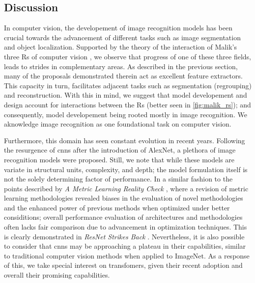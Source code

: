 \subsection{Discussion}
\label{subsec:rel_recon_discussion}
In computer vision, the developement of image recognition models has been crucial 
towards the advancement of different tasks such as image segmentation and object localization. 
Supported by the theory of the interaction of Malik's three Rs of computer vision 
\autocite{malik2016three}, we observe that progress of one of these three fields, leads to strides 
in complementary areas. As described in the previous section, many of the proposals demonstrated 
therein act as excellent feature extractors. This capacity in turn, facilitates adjacent tasks 
such as segmentation (regrouping) and reconstruction. With this in mind, we suggest that model 
developement and design account for interactions between the Rs (better seen in  
\autoref{fig:malik_rs}); and consequently, model developement being rooted mostly in image 
recognition. We aknowledge image recognition as one foundational task on computer vision.



\noindent Furthermore, this domain has seen constant evolution in recent years. Following the 
resurgence of \glspl{cnn} after the introduction of AlexNet, a plethora of image recognition models 
were proposed. Still, we note that while these models are variate in structural units, complexity, 
and depth; the model formulation  itself is not the solely determining factor of performance.  
In a similar fashion to the points described by \emph{A Metric Learning Reality 
Check} \autocite{musgrave2020metric}, where a revision of metric learning methodologies revealed 
biases in the evaluation of novel methodologies and the enhanced power of 
previous methods when optimized under better considitions; overall performance evaluation of 
architectures and methodologies often lacks fair comparison due to advancement in optimization 
techniques. This is clearly demonstrated in \emph{ResNet Strikes Back} \autocite{wightman2021resnet}. 
Nevertheless, it is also possible to consider that \glspl{cnn} may be approaching a plateau in 
their capabilities, similar to traditional computer vision methods  when applied to ImageNet. As 
a response of this, we take special interest on transfomers, given their recent adoption and 
overall their promising capabilities. \\

